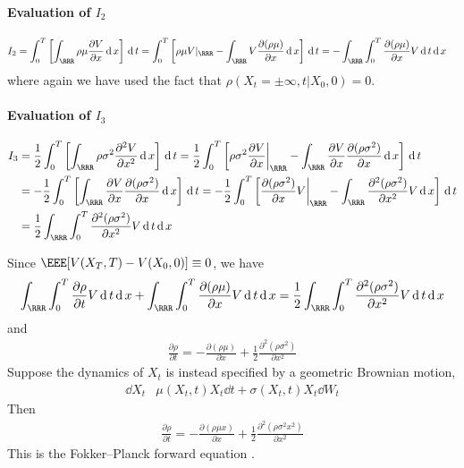 \paragraph{Evaluation of $I_2$}
\begin{align}
  I_2 & = \int_0^T \left[\int_\RRR \rho \mu \frac{\partial V}{\partial x} \dd x \right] \dd t = \int_0^T\left[\rho\mu V|_\RRR - \int_\RRR V \frac{\partial(\rho\mu)}{\partial x} \dd x\right] \dd t = -\int_\RRR \int_0^T \frac{\partial (\rho \mu)}{\partial x} V \dd t \dd x
\end{align}
where again we have used the fact that $\rho(X_t = \pm \infty, t | X_0, 0) = 0$.

\paragraph{Evaluation of $I_3$}
\begin{align}
  I_3 & = \frac{1}{2} \int_0^T \left[\int_\RRR \rho\sigma^2 \frac{\partial^2 V}{\partial x^2} \dd x\right] \dd t = \frac{1}{2}\int_0^T \left[\rho\sigma^2\frac{\partial V}{\partial x}\bigg\vert_\RRR - \int_\RRR \frac{\partial V}{\partial x} \frac{\partial (\rho \sigma^2)}{\partial x} \dd x\right] \dd t \nonumber\\
  &= -\frac{1}{2}\int_0^T \left[\int_\RRR \frac{\partial V}{\partial x}\frac{\partial(\rho\sigma^2)}{\partial x} \dd x\right] \dd t = -\frac{1}{2}\int_0^T \left[\frac{\partial(\rho \sigma^2)}{\partial x}V \bigg\vert_\RRR - \int_\RRR \frac{\partial^2 (\rho\sigma^2)}{\partial x^2} V \dd x\right] \dd t \nonumber\\
  &= \frac{1}{2}\int_\RRR\int_0^T \frac{\partial^2(\rho\sigma^2)}{\partial x^2}V \dd t \dd x
\end{align}

Since $\EEE[V(X_T,T) - V(X_0,0)] \equiv 0$, we have
\begin{align}
   \int_\RRR \int_0^T \frac{\partial \rho}{\partial t} V \dd t \dd x + \int_\RRR \int_0^T \frac{\partial (\rho \mu)}{\partial x} V \dd t \dd x = \frac{1}{2}\int_\RRR\int_0^T \frac{\partial^2(\rho\sigma^2)}{\partial x^2}V \dd t \dd x
\end{align}
and
\begin{align}
  \frac{\partial \rho}{\partial t} = - \frac{\partial(\rho \mu)}{\partial x} + \frac{1}{2} \frac{\partial^2(\rho \sigma^2)}{\partial x^2}
\end{align}
Suppose the dynamics of $X_t$ is instead specified by a geometric Brownian motion,
\begin{align}
  \dd X_t & \mu(X_t, t)X_t \dd t + \sigma(X_t, t)X_t \dd W_t
\end{align}
Then
\begin{align}\label{Fokker--Planck Forward Equation}
  \frac{\partial \rho}{\partial t} = - \frac{\partial(\rho \mu x)}{\partial x} + \frac{1}{2} \frac{\partial^2(\rho \sigma^2 x^2)}{\partial x^2}
\end{align}
This is the Fokker--Planck forward equation \cite{Rouah, Harrison05}.



